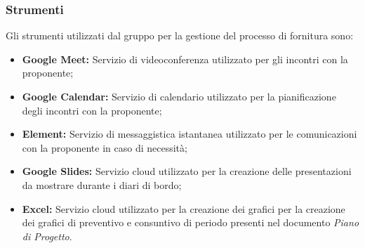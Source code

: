 \subsubsection{Strumenti}
Gli strumenti utilizzati dal gruppo per la gestione del processo di fornitura sono:
\begin{itemize}
    \item \textbf{Google Meet:}
    Servizio di videoconferenza utilizzato per gli incontri con la proponente;
    \item  \textbf{Google Calendar:}
    Servizio di calendario utilizzato per la pianificazione degli incontri con la proponente;
    \item 
    \textbf{Element:}
    Servizio di messaggistica istantanea utilizzato per le comunicazioni con la proponente in caso di necessità;
    \item 
    \textbf{Google Slides:}
    Servizio cloud utilizzato per la creazione delle presentazioni da mostrare durante i diari di bordo;
    \item  \textbf{Excel:} Servizio cloud utilizzato per la creazione dei grafici per la creazione dei grafici di preventivo e consuntivo di periodo presenti nel documento \textit{Piano di Progetto}.
\end{itemize}

